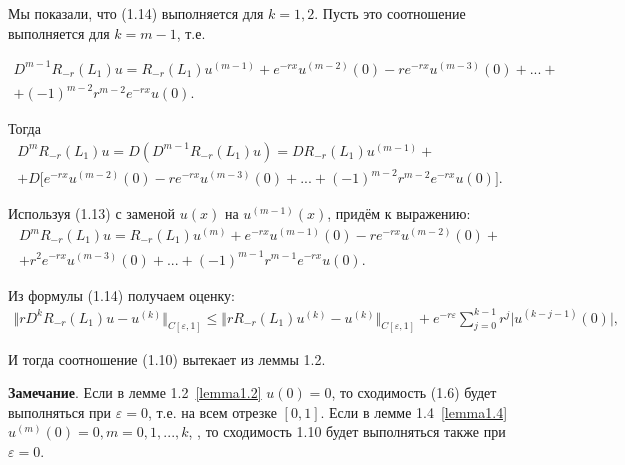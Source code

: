 Мы показали, что (1.14) выполняется для $ k = 1,2 $. Пусть это соотношение выполняется для $ k = m - 1 $, т.е.

\begin{equation}
\begin{array}{c}
\nonumber

D^{m-1}R_{-r}(L_1)u = R_{-r}(L_1)u^{(m-1)} + e^{-rx}u^{(m-2)}(0) - re^{-rx}u^{(m-3)}(0) + ... + \\
+ (-1)^{m-2}r^{m-2}e^{-rx}u(0).

\end{array}
\end{equation}

Тогда
\begin{equation}
\begin{array}{c}
\nonumber

D^mR_{-r}(L_1)u = D(D^{m-1}R_{-r}(L_1)u) = DR_{-r}(L_1)u^{(m-1)} + \\
+ D\bigl[e^{-rx}u^{(m-2)}(0) - re^{-rx}u^{(m-3)}(0) + ... + (-1)^{m-2}r^{m-2}e^{-rx}u(0)\bigr].

\end{array}
\end{equation}

Используя (1.13) с заменой $ u(x) $ на $ u^{(m-1)}(x) $, придём к выражению:
\begin{equation}
\begin{array}{c}
\nonumber

D^mR_{-r}(L_1)u = R_{-r}(L_1)u^{(m)} + e^{-rx}u^{(m-1)}(0) - re^{-rx}u^{(m-2)}(0) + \\
+ r^2e^{-rx}u^{(m-3)}(0) + ... + (-1)^{m-1}r^{m-1}e^{-rx}u(0).

\end{array}
\end{equation}

Из формулы (1.14) получаем оценку:
\begin{equation}
\begin{array}{c}
\nonumber

\bigl\Vert rD^kR_{-r}(L_1)u - u^{(k)}\bigr\Vert_{C[\varepsilon ,1]} \leq \bigl\Vert rR_{-r}(L_1)u^{(k)} - u^{(k)}\bigr\Vert_{C[\varepsilon ,1]} + e^{-r\varepsilon}\sum\limits_{j=0}^{k-1} r^j\vert u^{(k-j-1)}(0)\vert,

\end{array}
\end{equation}

И тогда соотношение (1.10) вытекает из леммы 1.2.

\textbf{Замечание}. Если в лемме 1.2~\eqref{lemma1.2} $ u(0) = 0 $, то сходимость (1.6) будет выполняться при $ \varepsilon = 0$, т.е. на всем отрезке $ [0,1] $. Если в лемме 1.4~\eqref{lemma1.4} $ u^{(m)}(0) = 0, m = 0,1,...,k $, , то сходимость 1.10 будет выполняться также при $ \varepsilon = 0 $.

